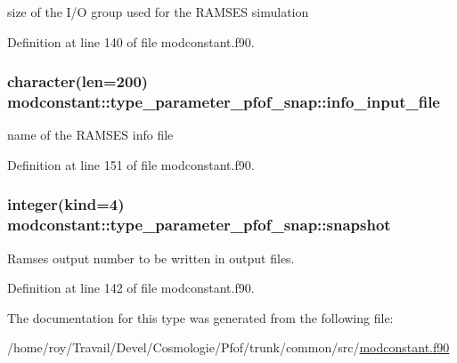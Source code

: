 size of the I/O group used for the R\+A\+M\+S\+ES simulation 



Definition at line 140 of file modconstant.\+f90.

\subsubsection[{\texorpdfstring{info\+\_\+input\+\_\+file}{info_input_file}}]{\setlength{\rightskip}{0pt plus 5cm}character(len=200) modconstant\+::type\+\_\+parameter\+\_\+pfof\+\_\+snap\+::info\+\_\+input\+\_\+file}\hypertarget{structmodconstant_1_1type__parameter__pfof__snap_a0337983bc6b424f1291afffd5f318eae}{}\label{structmodconstant_1_1type__parameter__pfof__snap_a0337983bc6b424f1291afffd5f318eae}


name of the R\+A\+M\+S\+ES info file 



Definition at line 151 of file modconstant.\+f90.

\subsubsection[{\texorpdfstring{snapshot}{snapshot}}]{\setlength{\rightskip}{0pt plus 5cm}integer(kind=4) modconstant\+::type\+\_\+parameter\+\_\+pfof\+\_\+snap\+::snapshot}\hypertarget{structmodconstant_1_1type__parameter__pfof__snap_aa9924ed26e50de32aa9bb74c85aa0d32}{}\label{structmodconstant_1_1type__parameter__pfof__snap_aa9924ed26e50de32aa9bb74c85aa0d32}


Ramses output number to be written in output files. 



Definition at line 142 of file modconstant.\+f90.



The documentation for this type was generated from the following file\+:\begin{DoxyCompactItemize}
\item 
/home/roy/\+Travail/\+Devel/\+Cosmologie/\+Pfof/trunk/common/src/\hyperlink{modconstant_8f90}{modconstant.\+f90}\end{DoxyCompactItemize}
